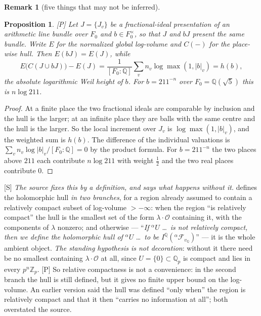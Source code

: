 \documentclass[11pt]{article}
\theoremstyle{plain}
\newtheorem{proposition}{Proposition}
\theoremstyle{definition}
\newtheorem{remark}{Remark}
\begin{document}
\begin{remark}[five things that may not be inferred]
\begin{proposition}\label{p:reprheight}
\textup{[P]} Let $J=\{J_v\}$ be a fractional-ideal presentation of an arithmetic line
bundle over $F_0$ and $b\in F_0^\times$, so that $J$ and $bJ$ present the same bundle.
Write $E$ for the normalized global log-volume and $C(-)$ for the place-wise hull.
Then $E(bJ)=E(J)$, while
\[
 E\bigl(C(J\cup bJ)\bigr)-E(J)
 =\frac1{[F_0:\mathbb Q]}\sum_v n_v\log\max(1,|b|_v)=h(b),
\]
the absolute logarithmic Weil height of $b$.  For $b=211^{-n}$ over
$F_0=\mathbb Q(\sqrt5)$ this is $n\log211$.
\end{proposition}

\begin{proof}
At a finite place the two fractional ideals are comparable by inclusion and the hull
is the larger; at an infinite place they are balls with the same centre and the hull
is the larger.  So the local increment over $J_v$ is $\log\max(1,|b|_v)$, and the
weighted sum is $h(b)$.  The difference of the individual valuations is
$\sum_vn_v\log|b|_v/[F_0:\mathbb Q]=0$ by the product formula.  For $b=211^{-n}$ the
two places above $211$ each contribute $n\log211$ with weight $\tfrac12$ and the two
real places contribute $0$.
\end{proof}

\textup{[S]} \emph{The source fixes this by a definition, and says what happens
without it.}  \cite[Rem.~3.9.5(i)]{IUT3} defines the holomorphic hull \emph{in two
branches}, for a region already assumed to contain a relatively compact subset of
log-volume $>-\infty$: when the region ``is relatively compact'' the hull is the
smallest set of the form $\lambda\cdot\mathcal O$ containing it, with the components
of $\lambda$ nonzero; and otherwise --- ``\emph{If} $^\alpha U$ \dots\ \emph{is not
relatively compact, then we define the holomorphic hull of} $^\alpha U$ \dots\
\emph{to be} $I^{\mathbb Q}(^\alpha\mathcal F_{v_{\mathbb Q}})$'' --- it is the whole
ambient object.  \emph{The standing hypothesis is not decoration}: without it there
need be no smallest containing $\lambda\cdot\mathcal O$ at all, since
$U=\{0\}\subset\mathbb{Q}_p$ is compact and lies in every $p^{n}\mathbb{Z}_p$.
\textup{[P]} So relative compactness is not a convenience: in the second branch the
hull is still defined, but it gives no finite upper bound on the log-volume.  An
earlier version said the hull was defined ``only when'' the region is relatively
compact and that it then ``carries no information at all''; both overstated the
source.


\end{remark}
\end{document}
